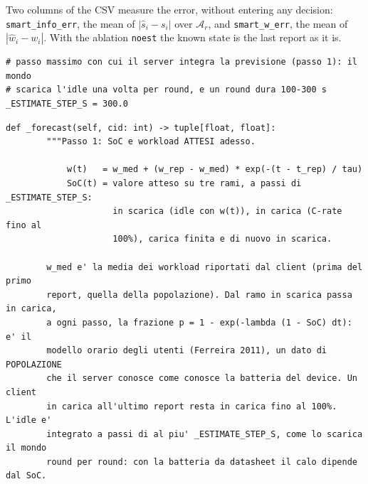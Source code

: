 \documentclass[11pt,a4paper]{article}
\newcommand{\cf}[1]{\texttt{#1}}
\begin{document}
Two columns of the CSV measure the error, without entering any decision:
\cf{smart\_info\_err}, the mean of $|\hat{s}_i - s_i|$ over $\mathcal{A}_r$, and
\cf{smart\_w\_err}, the mean of $|\hat{w}_i - w_i|$. With the ablation
\cf{noest} the known state is the last report as it is.

\begin{lstlisting}[style=py,firstnumber=25,caption={\texttt{tesifl/strategies/sage\_smart.py}, lines 25--27}]
# passo massimo con cui il server integra la previsione (passo 1): il mondo
# scarica l'idle una volta per round, e un round dura 100-300 s
_ESTIMATE_STEP_S = 300.0
\end{lstlisting}

\begin{lstlisting}[style=py,firstnumber=383,caption={\texttt{tesifl/strategies/sage\_smart.py}, lines 383--464}]
    def _forecast(self, cid: int) -> tuple[float, float]:
        """Passo 1: SoC e workload ATTESI adesso.

            w(t)   = w_med + (w_rep - w_med) * exp(-(t - t_rep) / tau)
            SoC(t) = valore atteso su tre rami, a passi di _ESTIMATE_STEP_S:
                     in scarica (idle con w(t)), in carica (C-rate fino al
                     100%), carica finita e di nuovo in scarica.

        w_med e' la media dei workload riportati dal client (prima del primo
        report, quella della popolazione). Dal ramo in scarica passa in carica,
        a ogni passo, la frazione p = 1 - exp(-lambda (1 - SoC) dt): e' il
        modello orario degli utenti (Ferreira 2011), un dato di POPOLAZIONE
        che il server conosce come conosce la batteria del device. Un client
        in carica all'ultimo report resta in carica fino al 100%. L'idle e'
        integrato a passi di al piu' _ESTIMATE_STEP_S, come lo scarica il mondo
        round per round: con la batteria da datasheet il calo dipende dal SoC.


\end{lstlisting}
\end{document}

